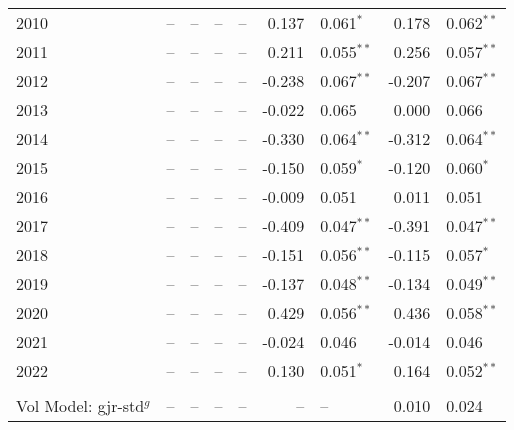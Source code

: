 \begin{table}
\begin{tabular}{l r l r l r l r l}
        2010                               &     -- & --            &      -- & --           &   0.137 & 0.061$^{*}$   &   0.178 & 0.062$^{**}$  \\
        2011                               &     -- & --            &      -- & --           &   0.211 & 0.055$^{**}$  &   0.256 & 0.057$^{**}$  \\
        2012                               &     -- & --            &      -- & --           &  -0.238 & 0.067$^{**}$  &  -0.207 & 0.067$^{**}$  \\
        2013                               &     -- & --            &      -- & --           &  -0.022 & 0.065         &   0.000 & 0.066         \\
        2014                               &     -- & --            &      -- & --           &  -0.330 & 0.064$^{**}$  &  -0.312 & 0.064$^{**}$  \\
        2015                               &     -- & --            &      -- & --           &  -0.150 & 0.059$^{*}$   &  -0.120 & 0.060$^{*}$   \\
        2016                               &     -- & --            &      -- & --           &  -0.009 & 0.051         &   0.011 & 0.051         \\
        2017                               &     -- & --            &      -- & --           &  -0.409 & 0.047$^{**}$  &  -0.391 & 0.047$^{**}$  \\
        2018                               &     -- & --            &      -- & --           &  -0.151 & 0.056$^{**}$  &  -0.115 & 0.057$^{*}$   \\
        2019                               &     -- & --            &      -- & --           &  -0.137 & 0.048$^{**}$  &  -0.134 & 0.049$^{**}$  \\
        2020                               &     -- & --            &      -- & --           &   0.429 & 0.056$^{**}$  &   0.436 & 0.058$^{**}$  \\
        2021                               &     -- & --            &      -- & --           &  -0.024 & 0.046         &  -0.014 & 0.046         \\
        2022                               &     -- & --            &      -- & --           &   0.130 & 0.051$^{*}$   &   0.164 & 0.052$^{**}$  \\  \\
        Vol Model: gjr-std$^{g}$           &     -- & --            &      -- & --           &      -- & --            &   0.010 & 0.024         \\

\end{tabular}
\end{table}
